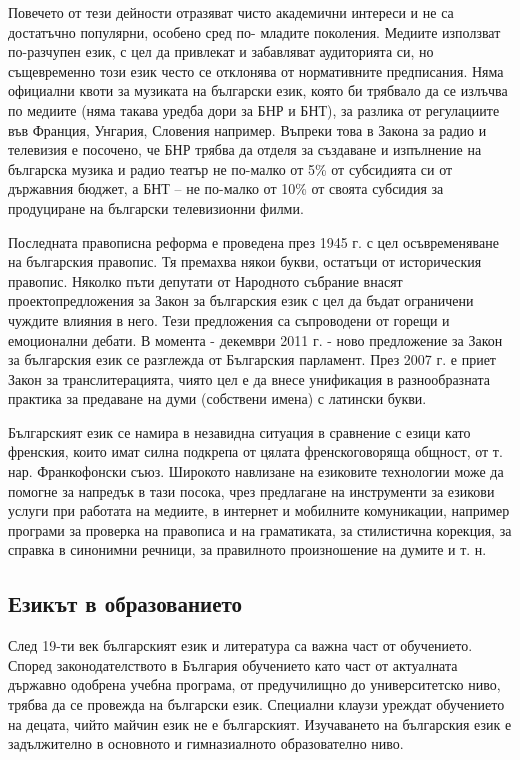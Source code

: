 \documentclass[]{../../metanetpaper}
\begin{document}
\begin{multicols}{2}
Повечето от тези дейности отразяват чисто академични
 интереси и не са достатъчно популярни, особено сред по-
младите поколения. Медиите използват по-разчупен
 език, с цел да привлекат и забавляват аудиторията си, но
 същевременно този език често се отклонява от
 нормативните предписания. Няма официални квоти за
 музиката на български език, която би трябвало да се
 излъчва по медиите (няма такава уредба дори за БНР и
 БНТ), за разлика от регулациите във Франция, Унгария, Словения например. Въпреки това в Закона за радио и телевизия е посочено, че БНР трябва да отделя за създаване и изпълнение на българска музика и радио театър не по-малко от 5\% от субсидията си от държавния
 бюджет, а БНТ – не по-малко от 10\% от своята субсидия
 за продуциране на български телевизионни филми.

Последната правописна реформа е проведена през 1945
 г. с цел осъвременяване на българския правопис. Тя
 премахва някои букви, остатъци от историческия правопис. Няколко пъти депутати от Народното събрание внасят проектопредложения за Закон за българския език с цел да бъдат ограничени чуждите влияния в него. Тези предложения са съпроводени от горещи и емоционални дебати. В момента - декември 2011 г. - ново предложение за Закон за българския език се разглежда от Българския парламент. През 2007 г. е приет Закон за транслитерацията, чиято цел е да внесе унификация в разнообразната практика за предаване на
 думи (собствени имена) с латински букви.

Българският език се намира в незавидна ситуация в
 сравнение с езици като френския, които имат силна подкрепа от цялата френскоговоряща общност, от т. нар.
 Франкофонски съюз. Широкото навлизане на езиковите
 технологии може да помогне за напредък в тази посока,
 чрез предлагане на инструменти за езикови услуги при
 работата на медиите, в интернет и мобилните комуникации, например програми за проверка на правописа
 и на граматиката, за стилистична корекция,
за справка в синонимни
 речници, за правилното произношение на думите и т. н.

\subsection{Езикът в образованието}

След 19-ти век българският език и литература са важна част
 от обучението. Според законодателството в България
 обучението като част от актуалната държавно одобрена
 учебна програма, от предучилищно до университетско
 ниво, трябва да се провежда на български език.
 Специални клаузи уреждат обучението на децата, чийто
 майчин език не е българският. Изучаването на
 българския език е задължително в основното и
 гимназиалното образователно ниво.


\end{multicols}
\end{document}
